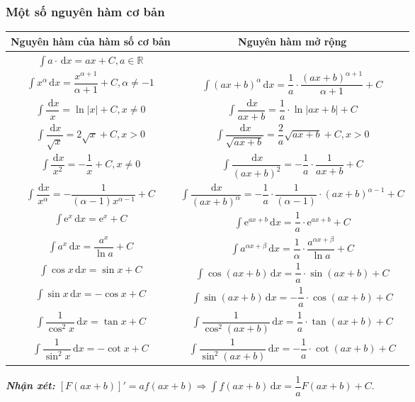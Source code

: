 \subsubsection{Một số nguyên hàm cơ bản}
\begin{longtable}{|c|c|}
	\hline
	 Nguyên hàm của hàm số cơ bản & Nguyên hàm mở rộng \\
	\hline
	$\displaystyle\int a\cdot\mathrm{\,d}x=ax+C, a\in\mathbb{R}$ & \\
	\hline
	$\displaystyle\int x^{\alpha}\mathrm{\,d}x=\dfrac{x^{\alpha+1}}{\alpha+1}+C,\alpha\neq-1$ & $\displaystyle\int(ax+b)^{\alpha}\mathrm{\,d}x=\dfrac{1}{a}\cdot\dfrac{(ax+b)^{\alpha+1}}{\alpha+1}+C$ \\
	\hline
	$\displaystyle\int\dfrac{\mathrm{\,d}x}{x}=\ln |x|+C, x\neq 0$ & $\displaystyle\int\dfrac{\mathrm{\,d}x}{ax+b}=\dfrac{1}{a}\cdot\ln |ax+b|+C$ \\
	\hline
	$\displaystyle\int\dfrac{\mathrm{\,d}x}{\sqrt{x}}=2\sqrt{x}+C, x>0$ & $\displaystyle\int\dfrac{\mathrm{\,d}x}{\sqrt{ax+b}}=\dfrac2a\sqrt{ax
	+b}+C, x>0$ \\
	\hline
	$\displaystyle\int\dfrac{\mathrm{\,d}x}{x^2}=-\dfrac{1}{x}+C, x\neq 0$ & $\displaystyle\int\dfrac{\mathrm{\,d}x}{(ax+b)^2}=-\dfrac{1}{a}\cdot \dfrac{1}{ax+b}+C$ \\
	\hline
	$\displaystyle\int\dfrac{\mathrm{\,d}x}{x^{\alpha}}=-\dfrac{1}{(\alpha-1)x^{\alpha-1}}+C$ & $\displaystyle\int\dfrac{\mathrm{\,d}x}{(ax+b)^{\alpha}}=-\dfrac{1}{a}\cdot \dfrac{1}{(\alpha-1)}\cdot (ax+b)^{\alpha-1}+C$ \\
	\hline
	$\displaystyle\int\mathrm{e}^x\mathrm{\,d}x=\mathrm{e}^x+C$ & $\displaystyle\int\mathrm{e}^{ax+b}\mathrm{\,d}x=\dfrac{1}{a}\cdot\mathrm{e}^{ax+b}+C$ \\
	\hline
	$\displaystyle\int a^x\mathrm{\,d}x=\dfrac{a^x}{\ln a}+C$ & $\displaystyle\int a^{\alpha x+\beta}\mathrm{\,d}x=\dfrac{1}{\alpha}\cdot\dfrac{a^{\alpha x+\beta}}{\ln a}+C$ \\
	\hline
	$\displaystyle\int\cos x\mathrm{\,d}x=\sin x+C$ & $\displaystyle\int\cos (ax+b)\mathrm{\,d}x=\dfrac{1}{a}\cdot\sin (ax+b)+C$ \\
	\hline
	$\displaystyle\int\sin x\mathrm{\,d}x=-\cos x+C$ & $\displaystyle\int\sin (ax+b)\mathrm{\,d}x=-\dfrac{1}{a}\cdot\cos (ax+b)+C$ \\
	\hline
	$\displaystyle\int\dfrac{1}{\cos^2x}\mathrm{\,d}x=\tan x+C$ & $\displaystyle\int\dfrac{1}{\cos^2(ax+b)}\mathrm{\,d}x=\dfrac{1}{a}\cdot \tan (ax+b)+C$ \\
	\hline
	$\displaystyle\int\dfrac{1}{\sin^2x}\mathrm{\,d}x=-\cot x+C$ & $\displaystyle\int\dfrac{1}{\sin^2(ax+b)}\mathrm{\,d}x=-\dfrac{1}{a}\cdot \cot(ax+b)+C$ \\
	\hline
\end{longtable}
\textit{\textbf{Nhận xét:} $[F(ax+b)]'=af(ax+b) \Rightarrow \int f(ax+b) \mathrm{\,d}x = \dfrac{1}{a} F(ax+b)+C$}.
\newpage
